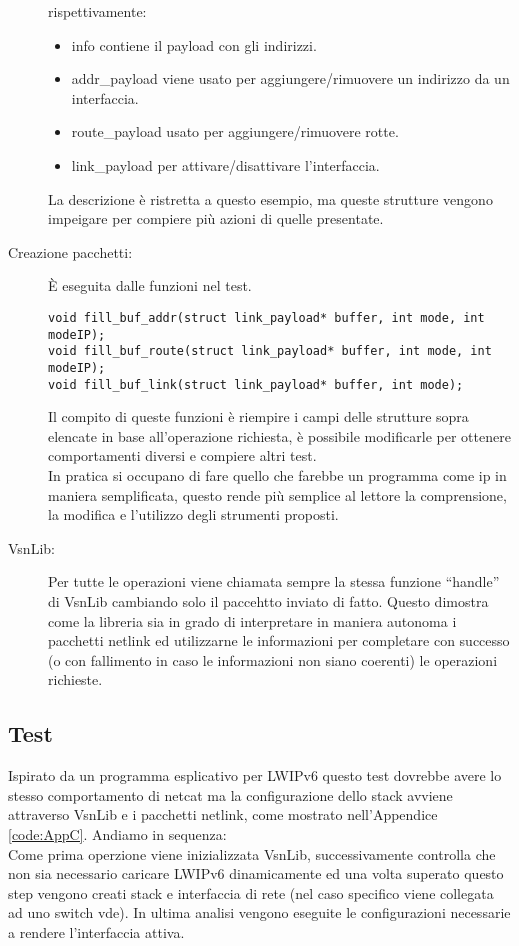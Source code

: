 \begin{description}
\begin{lstlisting}[style=CStyle]
\end{lstlisting}
rispettivamente:
\begin{itemize}
  \item info contiene il payload con gli indirizzi.
  \item addr\_payload viene usato per aggiungere/rimuovere un indirizzo da un interfaccia.
  \item route\_payload usato per aggiungere/rimuovere rotte.
  \item link\_payload per attivare/disattivare l'interfaccia.
\end{itemize}
La descrizione \`e ristretta a questo esempio, ma queste strutture vengono impeigare per compiere pi\`u azioni di quelle presentate.
\item[Creazione pacchetti: ]\`E eseguita dalle funzioni nel test.
\begin{lstlisting}[style=CStyle]
void fill_buf_addr(struct link_payload* buffer, int mode, int modeIP);
void fill_buf_route(struct link_payload* buffer, int mode, int modeIP);
void fill_buf_link(struct link_payload* buffer, int mode);
\end{lstlisting}
Il compito di queste funzioni \`e riempire i campi delle strutture sopra elencate in base all'operazione richiesta, \`e possibile modificarle per ottenere comportamenti diversi e compiere altri test.\\
In pratica si occupano di fare quello che farebbe un programma come ip in maniera semplificata, questo rende pi\`u semplice al lettore la comprensione, la modifica e l'utilizzo degli strumenti proposti.
\item[VsnLib: ]Per tutte le operazioni viene chiamata sempre la stessa funzione ``handle'' di VsnLib cambiando solo il paccehtto inviato di fatto. Questo dimostra come la libreria sia in grado di interpretare in maniera autonoma i pacchetti netlink ed utilizzarne le informazioni per completare con successo (o con fallimento in caso le informazioni non siano coerenti) le operazioni richieste.
\end{description}
\subsection{Test}
Ispirato da un programma esplicativo per LWIPv6 questo test dovrebbe avere lo stesso comportamento di netcat ma la configurazione dello stack avviene attraverso VsnLib e i pacchetti netlink, come mostrato nell'Appendice \ref{code:AppC}.
Andiamo in sequenza:\\
Come prima operzione viene inizializzata VsnLib, successivamente controlla che non sia necessario caricare LWIPv6 dinamicamente ed una volta superato questo step vengono creati stack e interfaccia di rete (nel caso specifico viene collegata ad uno switch vde). In ultima analisi vengono eseguite le configurazioni necessarie a rendere l'interfaccia attiva.
